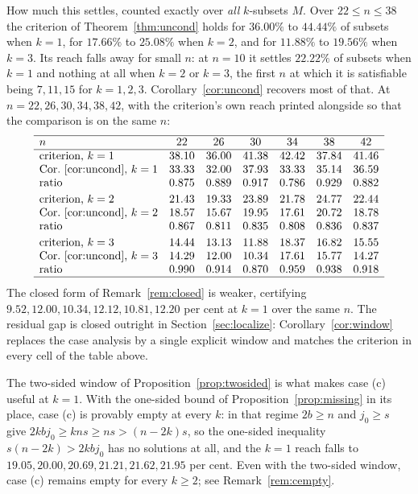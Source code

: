 \documentclass[11pt]{amsart}
\theoremstyle{plain}
\theoremstyle{definition}
\begin{document}
How much this settles, counted exactly over \emph{all} $k$-subsets $M$. Over $22\le n\le38$ the
criterion of Theorem~\ref{thm:uncond} holds for $36.00\%$ to $44.44\%$ of subsets when $k=1$, for
$17.66\%$ to $25.08\%$ when $k=2$, and for $11.88\%$ to $19.56\%$ when $k=3$. Its reach falls away
for small $n$: at $n=10$ it settles $22.22\%$ of subsets when $k=1$ and nothing at all when $k=2$ or
$k=3$, the first $n$ at which it is satisfiable being $7,11,15$ for $k=1,2,3$.
Corollary~\ref{cor:uncond} recovers most of that. At $n=22,26,30,34,38,42$, with the criterion's own
reach printed alongside so that the comparison is on the same $n$:
\[
\begin{array}{lcccccc}
\hline
n & 22 & 26 & 30 & 34 & 38 & 42\\
\hline
\text{criterion, }k=1 & 38.10 & 36.00 & 41.38 & 42.42 & 37.84 & 41.46\\
\text{Cor.~\ref{cor:uncond}, }k=1 & 33.33 & 32.00 & 37.93 & 33.33 & 35.14 & 36.59\\
\text{ratio} & 0.875 & 0.889 & 0.917 & 0.786 & 0.929 & 0.882\\[0.6ex]
\text{criterion, }k=2 & 21.43 & 19.33 & 23.89 & 21.78 & 24.77 & 22.44\\
\text{Cor.~\ref{cor:uncond}, }k=2 & 18.57 & 15.67 & 19.95 & 17.61 & 20.72 & 18.78\\
\text{ratio} & 0.867 & 0.811 & 0.835 & 0.808 & 0.836 & 0.837\\[0.6ex]
\text{criterion, }k=3 & 14.44 & 13.13 & 11.88 & 18.37 & 16.82 & 15.55\\
\text{Cor.~\ref{cor:uncond}, }k=3 & 14.29 & 12.00 & 10.34 & 17.61 & 15.77 & 14.27\\
\text{ratio} & 0.990 & 0.914 & 0.870 & 0.959 & 0.938 & 0.918\\
\hline
\end{array}
\]
The closed form of Remark~\ref{rem:closed} is weaker, certifying
$9.52,12.00,10.34,12.12,10.81,12.20$ per cent at $k=1$ over the same $n$. The residual gap is closed
outright in Section~\ref{sec:localize}: Corollary~\ref{cor:window} replaces the case analysis by a
single explicit window and matches the criterion in every cell of the table above.

The two-sided window of Proposition~\ref{prop:twosided} is what makes case (c) useful at $k=1$. With
the one-sided bound of Proposition~\ref{prop:missing} in its place, case (c) is provably empty at
every $k$: in that regime $2b\ge n$ and $j_0\ge s$ give $2kbj_0\ge kns\ge ns>(n-2k)s$, so the
one-sided inequality $s(n-2k)>2kbj_0$ has no solutions at all, and the $k=1$ reach falls to
$19.05,20.00,20.69,21.21,21.62,21.95$ per cent. Even with the two-sided window, case (c) remains
empty for every $k\ge2$; see Remark~\ref{rem:cempty}.
\end{document}
